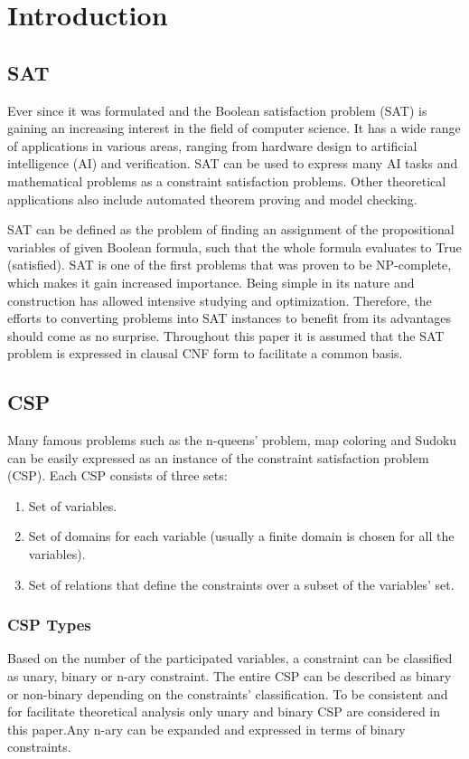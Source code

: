 \section{Introduction}\label{sec:intro}
\subsection{SAT}
Ever since it was formulated and the Boolean satisfaction problem (SAT) is gaining an increasing interest in the field of computer science. It has a wide range of applications in various areas, ranging from hardware design to artificial intelligence (AI) and verification. SAT can be used to express many AI tasks and mathematical problems as a constraint satisfaction problems. Other theoretical applications also include automated theorem proving and model checking.

SAT can be defined as the problem of finding an assignment of the propositional variables of given Boolean formula, such that the whole formula evaluates to True (satisfied).
SAT is one of the first problems that was proven to be NP-complete, which makes it gain increased importance.
Being simple in its nature and construction has allowed intensive studying and optimization. Therefore, the efforts to converting problems into SAT instances to benefit from its advantages should come as no surprise.
Throughout this paper it is assumed that the SAT problem is expressed in clausal CNF form to facilitate a common basis. %

\subsection{CSP}
Many famous problems such as the n-queens’ problem, map coloring and Sudoku can be easily expressed as an instance of the constraint satisfaction problem (CSP). Each CSP consists of three sets: 
\begin{enumerate}
	\item Set of variables.
	\item Set of domains for each variable (usually a finite domain is chosen for all the variables).
	\item Set of relations that define the constraints over a subset of the variables’ set.
\end{enumerate}

\subsubsection{CSP Types}
Based on the number of the participated variables, a constraint can be classified as unary, binary or n-ary constraint. The entire CSP can be described as binary or non-binary depending on the constraints’ classification. To be consistent and for facilitate theoretical analysis only unary and binary CSP are considered in this paper.Any n-ary can be expanded and expressed in terms of binary constraints.

